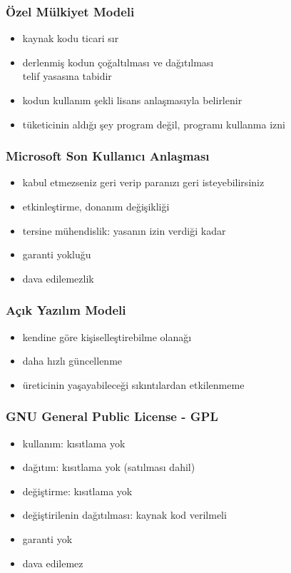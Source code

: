 \documentclass[dvipsnames]{beamer}
\theoremstyle{definition}
\theoremstyle{example}
\theoremstyle{plain}
\begin{document}
\begin{frame}
  \frametitle{Özel Mülkiyet Modeli}

  \begin{itemize}
    \item kaynak kodu ticari sır
    \item derlenmiş kodun çoğaltılması ve dağıtılması\\
      telif yasasına tabidir
    \item kodun kullanım şekli lisans anlaşmasıyla belirlenir

    \pause
    \medskip
    \item tüketicinin aldığı şey program değil, \alert{programı kullanma izni}
  \end{itemize}
\end{frame}

\begin{frame}
  \frametitle{Microsoft Son Kullanıcı Anlaşması}

  \begin{itemize}
    \item kabul etmezseniz geri verip paranızı geri isteyebilirsiniz
    \item etkinleştirme, donanım değişikliği
    \item tersine mühendislik: yasanın izin verdiği kadar
    \item garanti yokluğu
    \item dava edilemezlik
  \end{itemize}
\end{frame}

\begin{frame}
  \frametitle{Açık Yazılım Modeli}

  \begin{itemize}
    \item kendine göre kişiselleştirebilme olanağı
    \item daha hızlı güncellenme
    \item üreticinin yaşayabileceği sıkıntılardan etkilenmeme
  \end{itemize}
\end{frame}

\begin{frame}
  \frametitle{GNU General Public License - GPL}

  \begin{itemize}
    \item kullanım: kısıtlama yok
    \item dağıtım: kısıtlama yok (satılması dahil)
    \item değiştirme: kısıtlama yok
    \item değiştirilenin dağıtılması: kaynak kod verilmeli
    \item garanti yok
    \item dava edilemez
  \end{itemize}
\end{frame}
\end{document}
